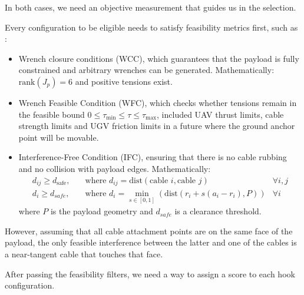 \noindent In both cases, we need an objective measurement that guides us in the selection.

\noindent Every configuration to be eligible needs to satisfy feasibility metrics first, such as \cite{cheng_cable_2023}:
\begin{itemize}
    \item Wrench closure conditions (WCC), which guarantees that the payload is fully constrained and arbitrary wrenches can be generated. Mathematically:
    $
    \text{rank}(J_p) = 6
    $
    and positive tensions exist.
    \item Wrench Feasible Condition (WFC), which checks whether tensions remain in the feasible bound $0\le \tau_{\text{min}} \le \tau \le \tau_{\text{max}}$, included UAV thrust limits, cable strength limits and UGV friction limits in a future where the ground anchor point will be movable.
    \item Interference-Free Condition (IFC), ensuring that there is no cable rubbing and no collision with payload edges. Mathematically:
    \begin{equation}
        \begin{aligned}
            d_{ij} \ge d_{\text{safe}}, \quad &\text{where } d_{ij} = \text{dist} \left(\text{cable } i, \text{cable } j\right) &\forall i, j \\
            d_i \ge d_{safe}, \quad &\text{where } d_i = \min_{s\in [0, 1]} \left( \text{dist} \left(r_i + s(a_i - r_i), P \right) \right) &\forall i 
        \end{aligned}
        \label{eq:IFCconstraint}
    \end{equation}
    where $P$ is the payload geometry and $d_{safe}$ is a clearance threshold.
\end{itemize}

However, assuming that all cable attachment points are on the same face of the payload, the only feasible interference between the latter and one of the cables is a near-tangent cable that touches that face. 

After passing the feasibility filters, we need a way to assign a score to each hook configuration.

